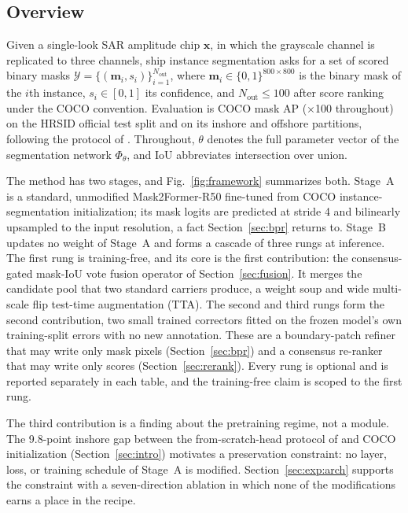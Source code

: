 \subsection{Overview}\label{sec:overview}

Given a single-look SAR amplitude chip $\mathbf{x}$, in which the grayscale channel is replicated to three channels, ship instance segmentation asks for a set of scored binary masks $\mathcal{Y}=\{(\mathbf{m}_i,s_i)\}_{i=1}^{N_{\mathrm{out}}}$, where $\mathbf{m}_i\in\{0,1\}^{800\times 800}$ is the binary mask of the $i$th instance, $s_i\in[0,1]$ its confidence, and $N_{\mathrm{out}}\le 100$ after score ranking under the COCO convention. Evaluation is COCO mask AP ($\times$100 throughout) on the HRSID official test split and on its inshore and offshore partitions, following the protocol of \cite{o2former2025}. Throughout, $\theta$ denotes the full parameter vector of the segmentation network $\Phi_{\theta}$, and IoU abbreviates intersection over union.

The method has two stages, and Fig.~\ref{fig:framework} summarizes both. Stage~A is a standard, unmodified Mask2Former-R50 \cite{mask2former2022} fine-tuned from COCO instance-segmentation initialization; its mask logits are predicted at stride 4 and bilinearly upsampled to the input resolution, a fact Section~\ref{sec:bpr} returns to. Stage~B updates no weight of Stage~A and forms a cascade of three rungs at inference. The first rung is training-free, and its core is the first contribution: the consensus-gated mask-IoU vote fusion operator of Section~\ref{sec:fusion}. It merges the candidate pool that two standard carriers produce, a weight soup and wide multi-scale flip test-time augmentation (TTA). The second and third rungs form the second contribution, two small trained correctors fitted on the frozen model's own training-split errors with no new annotation. These are a boundary-patch refiner that may write only mask pixels (Section~\ref{sec:bpr}) and a consensus re-ranker that may write only scores (Section~\ref{sec:rerank}). Every rung is optional and is reported separately in each table, and the training-free claim is scoped to the first rung.

The third contribution is a finding about the pretraining regime, not a module. The 9.8-point inshore gap between the from-scratch-head protocol of \cite{o2former2025} and COCO initialization (Section~\ref{sec:intro}) motivates a preservation constraint: no layer, loss, or training schedule of Stage~A is modified. Section~\ref{sec:exp:arch} supports the constraint with a seven-direction ablation in which none of the modifications earns a place in the recipe.

